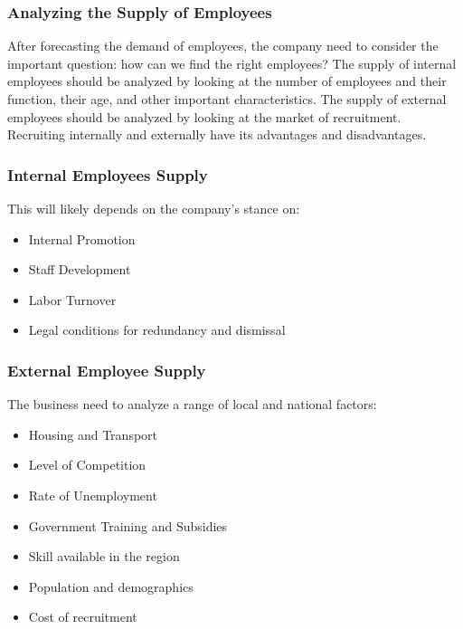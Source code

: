 \documentclass{standalone}
\begin{document}
\subsubsection{Analyzing the Supply of Employees}
After forecasting the demand of employees, the company need to consider the important question: how can we find the right employees?
The supply of internal employees should be analyzed by looking at the number of employees and their function, their age, and other important characteristics.
The supply of external employees should be analyzed by looking at the market of recruitment.
Recruiting internally and externally have its advantages and disadvantages.

\begin{center}
\end{center}

\subsubsection{Internal Employees Supply}
This will likely depends on the company's stance on:
\begin{itemize}
	\item Internal Promotion
	\item Staff Development
	\item Labor Turnover
	\item Legal conditions for redundancy and dismissal
\end{itemize}

\subsubsection{External Employee Supply}
The business need to analyze a range of local and national factors:
\begin{itemize}
	\item Housing and Transport
	\item Level of Competition
	\item Rate of Unemployment
	\item Government Training and Subsidies
	\item Skill available in the region
	\item Population and demographics
	\item Cost of recruitment
\end{itemize}
\end{document}
